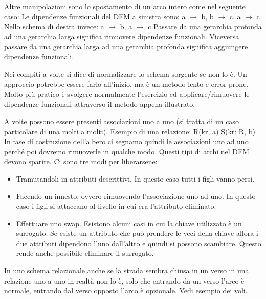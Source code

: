 Altre manipolazioni sono lo spostamento di un arco intero come nel seguente caso:
\noindent Le dipendenze funzionali del DFM a sinistra sono:\newline
a $\xrightarrow{}$ b, b $\xrightarrow{}$ c, a $\xrightarrow{}$ c\newline
Nello schema di destra invece:
a $\xrightarrow{}$ b, a $\xrightarrow{}$ c\newline
Passare da una gerarchia profonda ad una gerarchia larga significa rimuovere dipendenze funzionali. Viceversa passare da una gerarchia larga ad una gerarchia profonda significa aggiungere dipendenze funzionali.
\begin{warn}
	Nei compiti a volte si dice di normalizzare lo schema sorgente se non lo è. Un approccio potrebbe essere farlo all'inizio, ma è un metodo lento e error-prone. Molto più pratico è svolgere normalmente l'esercizio ed applicare/rimuovere le dipendenze funzionali attraverso il metodo appena illustrato.
\end{warn}
A volte possono essere presenti associazioni uno a uno (si tratta di un caso particolare di una molti a molti). Esempio di una relazione:\newline
R(\underline{kr}, a)\newline
S(\underline{kr}: R, b)\newline
{}
\noindent In fase di costruzione dell'albero ci segnamo quindi le associazioni uno ad uno perché poi dovremo rimuoverle in qualche modo. Questi tipi di archi nel DFM devono sparire. Ci sono tre modi per liberarsene:
\begin{itemize}
	\item Tramutandoli in attributi descrittivi. In questo caso tutti i figli vanno persi.
	\item Facendo un innesto, ovvero rimuovendo l'associazione uno ad uno. In questo caso i figli si attaccano al livello in cui era l'attributo eliminato.
	\item Effettuare uno swap. Esistono alcuni casi in cui la chiave utilizzato è un surrogato. Se esiste un attributo che può prendere le veci della chiave allora i due attributi dipendono l'uno dall'altro e quindi si possono scambiare. Questo rende anche possibile eliminare il surrogato.
\end{itemize}
\begin{warn}[]
	In uno schema relazionale anche se la strada sembra chiusa in un verso in una relazione uno a uno in realtà non lo è, solo che entrando da un verso l'arco è normale, entrando dal verso opposto l'arco è opzionale. Vedi esempio dei voli. 
\end{warn}
